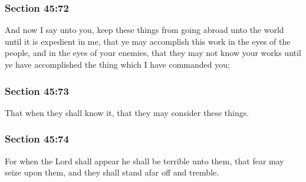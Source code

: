 	\subsubsection{Section 45:72} %
		\label{DC45-72}

		And now I say unto you, keep these things from going abroad unto the world until it is expedient in me, that ye may accomplish this work in the eyes of the people, and in the eyes of your enemies, that they may not know your works until ye have accomplished the thing which I have commanded you;


	\subsubsection{Section 45:73} %
		\label{DC45-73}

		That when they shall know it, that they may consider these things.


	\subsubsection{Section 45:74} %
		\label{DC45-74}

		For when the Lord shall appear he shall be terrible unto them, that fear may seize upon them, and they shall stand afar off and tremble.


